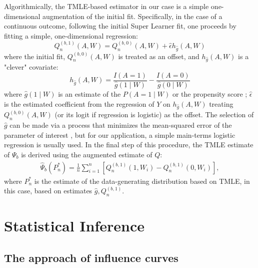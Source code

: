 Algorithmically, the TMLE-based estimator in our case is a simple
one-dimensional augmentation of the initial fit. Specifically, in the case of
a continuous outcome, following the initial Super Learner fit, one proceeds by
fitting a simple, one-dimensional regression:
$$
Q^{(b, 1)}_n(A, W) = Q^{(b, 0)}_n(A, W) + \hat{\epsilon} h_{\hat{g}}(A, W)
$$
where the initial fit, $Q^{(b, 0)}_n(A, W)$ is treated as an offset, and
$h_{\hat{g}}(A, W)$ is a "clever" covariate:
$$
h_{\hat{g}}(A, W) = \frac{I(A = 1)}{\hat{g}(1 \mid W)} -
\frac{I(A = 0)}{\hat{g}(0 \mid W)}
$$
where $\hat{g}(1 \mid W)$ is an estimate of the $P(A = 1 \mid W)$ or the
propensity score \cite{rosenbaum1983central}; $\hat{\epsilon}$ is the estimated
coefficient from the regression of $Y$ on $h_{\hat{g}}(A, W)$ treating
$Q^{(b, 0)}_n(A, W)$ (or its logit if regression is logistic) as the offset.
The selection of $\hat{g}$ can be made via a process that minimizes the
mean-squared error of the parameter of interest \cite{gruber2010application},
but for our application, a simple main-terms logistic regression is usually
used. In the final step of this procedure, the TMLE estimate of $\Psi_b$ is
derived using the augmented estimate of $Q$:
\begin{eqnarray}
  \hat{\Psi}_b(P^*_n) = \frac{1}{n}\sum^{n}_{i = 1}[Q^{(b, 1)}_n(1, W_i) - Q^{(b,
  1)}_{n}(0, W_i)],
\end{eqnarray}
where $P^*_n$ is the estimate of the data-generating distribution based on
TMLE, in this case, based on estimates $\hat{g},Q^{(b,1)}_n$.

\section{Statistical Inference}\label{inference}

\subsection{The approach of influence curves}\label{ic}

